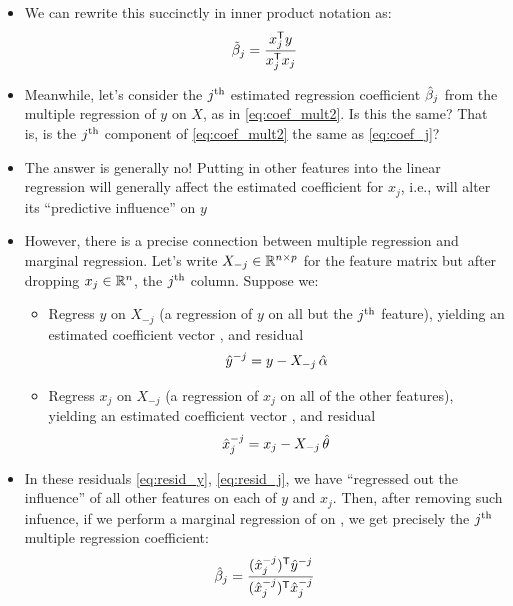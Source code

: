 \documentclass{article}
\begin{document}
\begin{itemize}
\item We can rewrite this succinctly in inner product notation as:
  \begin{equation}
  \label{eq:coef_j}
  \tilde\beta_j = \frac{x_j^{\mathsf{T}} y}{x_j^{\mathsf{T}} x_j}
  \end{equation}

\item Meanwhile, let's consider the $j^{\textnormal{th}}$ estimated regression coefficient
  $\hat{\beta}_j$ from the multiple regression of $y$ on $X$, as in
  \eqref{eq:coef_mult2}. Is this the same? That is, is the $j^{\textnormal{th}}$ component of
  \eqref{eq:coef_mult2} the same as \eqref{eq:coef_j}? 

\item The answer is generally no! Putting in other features into the linear
  regression will generally affect the estimated coefficient for $x_j$, i.e.,
  will alter its ``predictive influence'' on $y$

\item However, there is a precise connection between multiple regression and
  marginal regression. Let's write $X_{-j} \in \mathbb{R}^{n \times p}$ for the feature
  matrix but after dropping $x_j \in \mathbb{R}^n$, the $j^{\textnormal{th}}$ column. Suppose we:  
  \begin{itemize}
  \item Regress $y$ on $X_{-j}$ (a regression of $y$ on all but the $j^{\textnormal{th}}$
    feature), yielding an estimated coefficient vector , and residual  
    \begin{equation}
    \label{eq:resid_y}
    \hat{y}^{-j} = y - X_{-j} \, \hat{\alpha} 
    \end{equation}

  \item Regress $x_j$ on $X_{-j}$ (a regression of $x_j$ on all of the other
    features), yielding an estimated coefficient vector , and residual  
    \begin{equation}
    \label{eq:resid_j}
    \hat{x}^{-j}_j = x_j - X_{-j} \, \hat{\theta} 
    \end{equation}
  \end{itemize}

\item In these residuals \eqref{eq:resid_y}, \eqref{eq:resid_j}, we have
  ``regressed out the influence'' of all other features on each of $y$ and
  $x_j$. Then, after removing such infuence, if we perform a marginal regression
  of  on , we get precisely the
  $j^{\textnormal{th}}$ multiple regression coefficient: 
  \begin{equation}
  \label{eq:coef_j_mult}
  \hat{\beta}_j = \frac{(\hat{x}^{-j}_j)^{\mathsf{T}}\hat{y}^{-j}}
  {(\hat{x}^{-j}_j)^{\mathsf{T}}\hat{x}^{-j}_j} 
  \end{equation}


\end{itemize}
\end{document}
